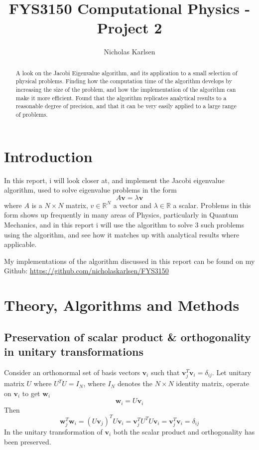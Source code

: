 \documentclass[10pt,showpacs,preprintnumbers,footinbib,amsmath,amssymb,aps,prl,twocolumn,groupedaddress,superscriptaddress,showkeys]{revtex4-1}
\begin{document}
\title{FYS3150 Computational Physics - Project 2}
\author{Nicholas Karlsen}

\begin{abstract}
  A look on the Jacobi Eigenvalue algorithm, and its application to a small selection of physical problems. Finding how the computation time of the algorithm develops by increasing the size of the problem, and how the implementation of the algorithm can make it more efficient. Found that the algorithm replicates analytical results to a reasonable degree of precision, and that it can be very easily applied to a large range of problems.
\end{abstract}

\maketitle

\section{Introduction}
  In this report, i will look closer at, and implement the Jacobi eigenvalue algorithm, used to solve eigenvalue problems in the form
  \begin{equation}
    A\mathbf v = \lambda \mathbf v
  \end{equation}
  where $A$ is a $N\times N$ matrix, $v\in \mathbb R^N$ a vector and $\lambda \in \mathbb R$ a scalar. Problems in this form shows up frequently in many areas of Physics, particularly in Quantum Mechanics, and in this report i will use the algorithm to solve 3 such problems using the algorithm, and see how it matches up with analytical results where applicable.

  My implementations of the algorithm discussed in this report can be found on my Github: \url{https://github.com/nicholaskarlsen/FYS3150}

\section{Theory, Algorithms and Methods}
  \subsection{Preservation of scalar product \& orthogonality in unitary transformations\label{subsec:preservation}}
    Consider an orthonormal set of basis vectors $\mathbf v_i$ such that $\mathbf v_j^T \mathbf v_i = \delta_{ij}$. Let unitary matrix $U$ where $U^T U= I_N$, where $I_N$ denotes the $N\times N$ identity matrix, operate on $\mathbf v_i$ to get $\mathbf w_i$
    \begin{equation}
      \mathbf w_i = U \mathbf v_i
    \end{equation}
    Then
    \begin{equation}
      \mathbf w_j^T\mathbf w_i = (U\mathbf v_j)^TU\mathbf v_i = \mathbf v_j^T U^T U \mathbf v_i
      = \mathbf v_j^T \mathbf v_i = \delta_{ij}
    \end{equation}
    In the unitary transformation of $\mathbf v_i$ both the scalar product and orthogonality has been preserved.
\end{document}
